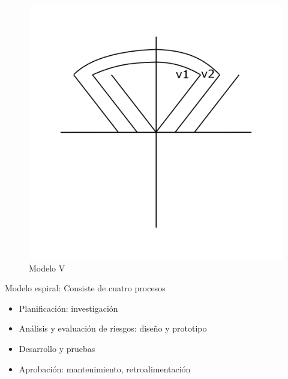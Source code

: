 \begin{enumerate}
    \begin{figure}[h!]
        \centering
            \includegraphics[scale=0.25]{Proyecto Integrador Figuras/01 Modelo v.png}
            \caption{Modelo V}
    \end{figure}
    
    Modelo espiral: Consiste de cuatro procesos
    
    \begin{itemize}
        \item Planificación: investigación 
        \item Análisis y evaluación de riesgos: diseño y prototipo
        \item Desarrollo y pruebas
        \item Aprobación: mantenimiento, retroalimentación 
    \end{itemize}


\end{enumerate}
